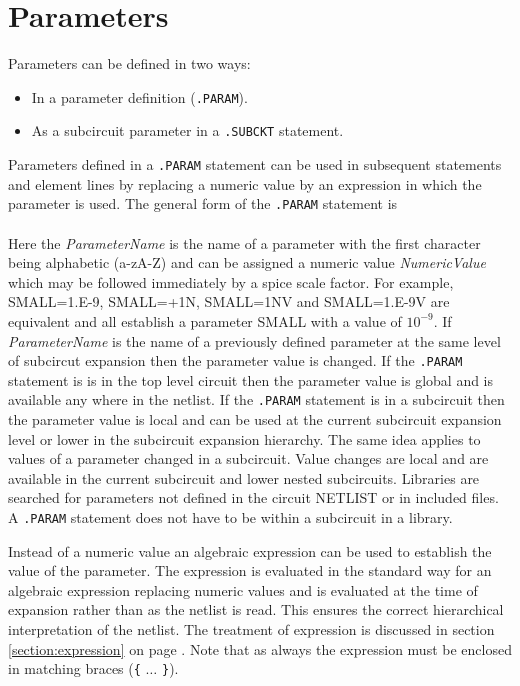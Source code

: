 \section{Parameters \label{section:parameters}}
Parameters can be defined in two ways:
\begin{itemize}
\item In a parameter definition ({\tt .PARAM}).
\item As a subcircuit parameter in a {\tt .SUBCKT} statement.
\end{itemize}
Parameters defined in a {\tt .PARAM} statement
can be used in subsequent statements
and element lines by replacing a numeric value by an expression in which the
parameter is used. The general form of the {\tt .PARAM} statement is\\

\hspace*{\fill}\\
Here the {\it ParameterName} is the name of a parameter with the first character
being alphabetic (a-zA-Z) and can be assigned a numeric value
{\it NumericValue} which may be followed immediately by a spice scale
factor. For example, SMALL=1.E-9, SMALL=+1N, SMALL=1NV and SMALL=1.E-9V are
equivalent and all establish a parameter SMALL with a value of $10^{-9}$.
If {\it ParameterName} is the name of a
previously defined parameter at the same level of subcircut expansion
then the parameter value is changed.
If the {\tt .PARAM} statement is
is in the top level circuit then the parameter value is global and is
available any where in the netlist.
If the {\tt .PARAM} statement is in a subcircuit then the parameter value
is local and can be used at the current subcircuit expansion level or lower
in the subcircuit expansion hierarchy.
The same idea applies to values of a parameter
changed in a subcircuit.  Value changes are local and are available in the
current subcircuit and lower nested
subcircuits.  {Libraries are searched for parameters not
defined in the
      circuit NETLIST or in included files. A {\tt .PARAM} statement does
      not have to be within a subcircuit in a library.}

Instead of a numeric value an algebraic expression can be used to establish
the value of the parameter.
The expression is evaluated in the standard
way for an algebraic expression replacing numeric values and is evaluated at
the time of expansion rather than as the netlist is read.
  This ensures the correct
hierarchical interpretation of the netlist.  The treatment of expression is
discussed in section \ref{section:expression} on page
\pageref{section:expression}.  Note that as always the expression must be
enclosed in matching braces ({\tt \{} $\ldots$ {\tt \}}).

